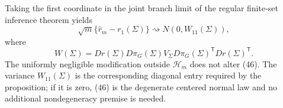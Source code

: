 Taking the first coordinate in the joint branch limit of the regular finite-set inference theorem yields
\[
 \sqrt m\{\widehat r_m-r_1(\Sigma)\}
 \rightsquigarrow N(0,W_{11}(\Sigma)),                          \tag{46}
\]
where
\[
 W(\Sigma)
 =Dr(\Sigma)D\pi_G(\Sigma)V_\Sigma
  D\pi_G(\Sigma)^{\mathsf T}Dr(\Sigma)^{\mathsf T}.            \tag{47}
\]
The uniformly negligible modification outside \(\mathcal H_m\) does not alter (46).  The variance \(W_{11}(\Sigma)\) is the corresponding diagonal entry required by the proposition; if it is zero, (46) is the degenerate centered normal law and no additional nondegeneracy premise is needed.
